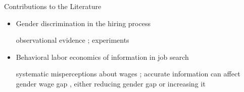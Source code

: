 \begin{frame}{Contributions to the Literature}
    \begin{itemize}
    \item Gender discrimination in the hiring process
        
    {\scriptsize observational evidence \citep{kuhn2012gender,kuhn2020gender}; experiments \citep{goldin2000orchestrating,neumark2018experimental,rich2014field}}
    \item Behavioral labor economics of information in job search
    
    {\scriptsize systematic misperceptions about wages \citep{jager2022worker}; accurate information can affect gender wage gap \citep{bennedsen2022firms,cullen2019equilibrium,cortes2021gender}, either reducing gender gap \citep{baker2019pay,rigdon2012experimental} or increasing it \citep{exley2020knowing}}
    \end{itemize}
\end{frame}